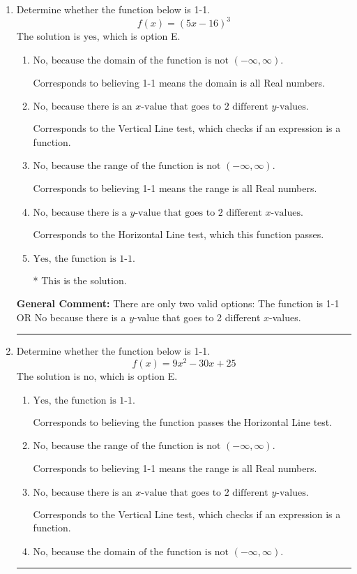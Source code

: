 \documentclass{extbook}[14pt]
\newcommand{\litem}[1]{\item #1

\rule{\textwidth}{0.4pt}}
\begin{document}
\begin{enumerate}\litem{
Determine whether the function below is 1-1.
\[ f(x) = (5 x - 16)^3 \]The solution is \( \text{yes} \), which is option E.\begin{enumerate}[label=\Alph*.]
\item \( \text{No, because the domain of the function is not $(-\infty, \infty)$.} \)

Corresponds to believing 1-1 means the domain is all Real numbers.
\item \( \text{No, because there is an $x$-value that goes to 2 different $y$-values.} \)

Corresponds to the Vertical Line test, which checks if an expression is a function.
\item \( \text{No, because the range of the function is not $(-\infty, \infty)$.} \)

Corresponds to believing 1-1 means the range is all Real numbers.
\item \( \text{No, because there is a $y$-value that goes to 2 different $x$-values.} \)

Corresponds to the Horizontal Line test, which this function passes.
\item \( \text{Yes, the function is 1-1.} \)

* This is the solution.
\end{enumerate}

\textbf{General Comment:} There are only two valid options: The function is 1-1 OR No because there is a $y$-value that goes to 2 different $x$-values.
}
\litem{
Determine whether the function below is 1-1.
\[ f(x) = 9 x^2 - 30 x + 25 \]The solution is \( \text{no} \), which is option E.\begin{enumerate}[label=\Alph*.]
\item \( \text{Yes, the function is 1-1.} \)

Corresponds to believing the function passes the Horizontal Line test.
\item \( \text{No, because the range of the function is not $(-\infty, \infty)$.} \)

Corresponds to believing 1-1 means the range is all Real numbers.
\item \( \text{No, because there is an $x$-value that goes to 2 different $y$-values.} \)

Corresponds to the Vertical Line test, which checks if an expression is a function.
\item \( \text{No, because the domain of the function is not $(-\infty, \infty)$.} \)


\end{enumerate}}
\end{enumerate}
\end{document}
